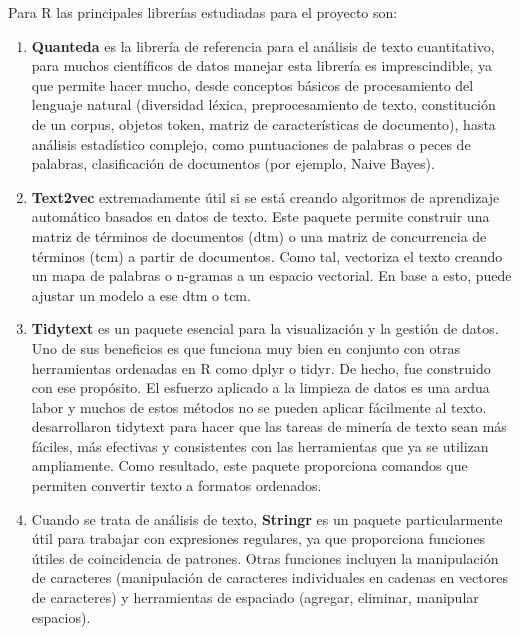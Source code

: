 Para R las principales librerías estudiadas para el proyecto son:

\begin{enumerate}
    \item \textbf{Quanteda} es la librería de referencia para el análisis de texto cuantitativo, para muchos científicos de datos manejar esta librería es imprescindible, ya que permite hacer mucho, desde conceptos básicos de procesamiento del lenguaje natural (diversidad léxica, preprocesamiento de texto, constitución de un corpus, objetos token, matriz de características de documento), hasta análisis estadístico complejo, como puntuaciones de palabras o peces de palabras, clasificación de documentos (por ejemplo, Naive Bayes).
    
    \item \textbf{Text2vec} extremadamente útil si se está creando algoritmos de aprendizaje automático basados en datos de texto. Este paquete permite construir una matriz de términos de documentos (dtm) o una matriz de concurrencia de términos (tcm) a partir de documentos. Como tal, vectoriza el texto creando un mapa de palabras o n-gramas a un espacio vectorial. En base a esto, puede ajustar un modelo a ese dtm o tcm.
    
    \item \textbf{Tidytext} es un paquete esencial para la visualización y la gestión de datos. Uno de sus beneficios es que funciona muy bien en conjunto con otras herramientas ordenadas en R como dplyr o tidyr. De hecho, fue construido con ese propósito. El esfuerzo aplicado a la limpieza de datos es una ardua labor y muchos de estos métodos no se pueden aplicar fácilmente al texto. \citet{silge2016tidytext} desarrollaron tidytext para hacer que las tareas de minería de texto sean más fáciles, más efectivas y consistentes con las herramientas que ya se utilizan ampliamente. Como resultado, este paquete proporciona comandos que permiten convertir texto a formatos ordenados.
    
    \item Cuando se trata de análisis de texto, \textbf{Stringr} es un paquete particularmente útil para trabajar con expresiones regulares, ya que proporciona funciones útiles de coincidencia de patrones. Otras funciones incluyen la manipulación de caracteres (manipulación de caracteres individuales en cadenas en vectores de caracteres) y herramientas de espaciado (agregar, eliminar, manipular espacios).
\end{enumerate}

